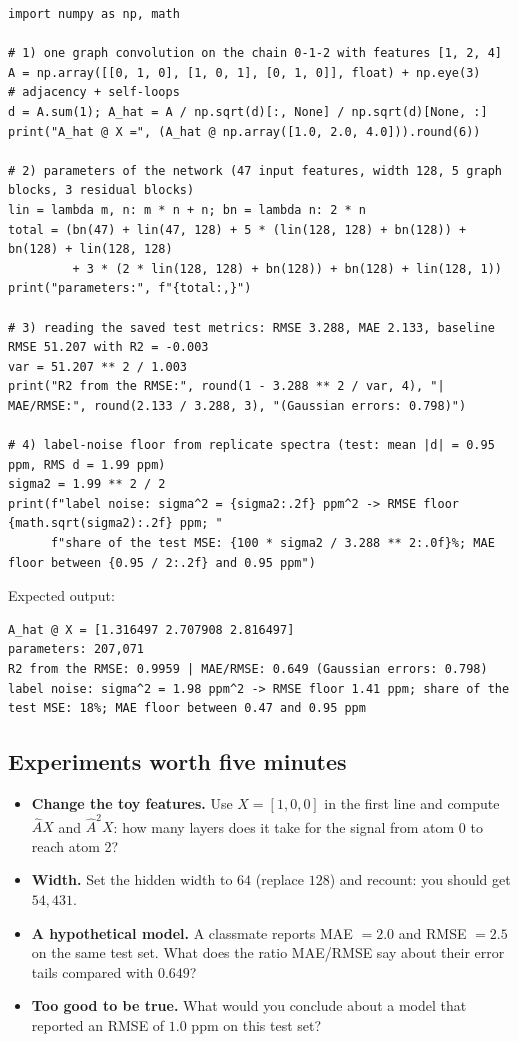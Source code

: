 \documentclass[11pt]{article}
\newcommand{\Ah}{\hat{A}}
\begin{document}
\begin{lstlisting}
import numpy as np, math

# 1) one graph convolution on the chain 0-1-2 with features [1, 2, 4]
A = np.array([[0, 1, 0], [1, 0, 1], [0, 1, 0]], float) + np.eye(3)      # adjacency + self-loops
d = A.sum(1); A_hat = A / np.sqrt(d)[:, None] / np.sqrt(d)[None, :]
print("A_hat @ X =", (A_hat @ np.array([1.0, 2.0, 4.0])).round(6))

# 2) parameters of the network (47 input features, width 128, 5 graph blocks, 3 residual blocks)
lin = lambda m, n: m * n + n; bn = lambda n: 2 * n
total = (bn(47) + lin(47, 128) + 5 * (lin(128, 128) + bn(128)) + bn(128) + lin(128, 128)
         + 3 * (2 * lin(128, 128) + bn(128)) + bn(128) + lin(128, 1))
print("parameters:", f"{total:,}")

# 3) reading the saved test metrics: RMSE 3.288, MAE 2.133, baseline RMSE 51.207 with R2 = -0.003
var = 51.207 ** 2 / 1.003
print("R2 from the RMSE:", round(1 - 3.288 ** 2 / var, 4), "| MAE/RMSE:", round(2.133 / 3.288, 3), "(Gaussian errors: 0.798)")

# 4) label-noise floor from replicate spectra (test: mean |d| = 0.95 ppm, RMS d = 1.99 ppm)
sigma2 = 1.99 ** 2 / 2
print(f"label noise: sigma^2 = {sigma2:.2f} ppm^2 -> RMSE floor {math.sqrt(sigma2):.2f} ppm; "
      f"share of the test MSE: {100 * sigma2 / 3.288 ** 2:.0f}%; MAE floor between {0.95 / 2:.2f} and 0.95 ppm")
\end{lstlisting}

Expected output:
\begin{lstlisting}[language={},basicstyle=\ttfamily\small]
A_hat @ X = [1.316497 2.707908 2.816497]
parameters: 207,071
R2 from the RMSE: 0.9959 | MAE/RMSE: 0.649 (Gaussian errors: 0.798)
label noise: sigma^2 = 1.98 ppm^2 -> RMSE floor 1.41 ppm; share of the test MSE: 18%; MAE floor between 0.47 and 0.95 ppm
\end{lstlisting}

\subsection{Experiments worth five minutes}
\begin{itemize}[nosep]
  \item \textbf{Change the toy features.} Use $X=[1,0,0]$ in the first line and compute $\Ah X$ and $\Ah^2X$: how many layers does it take for the signal from atom 0 to reach atom 2?
  \item \textbf{Width.} Set the hidden width to $64$ (replace $128$) and recount: you should get $54{,}431$.
  \item \textbf{A hypothetical model.} A classmate reports MAE $=2.0$ and RMSE $=2.5$ on the same test set. What does the ratio MAE/RMSE say about their error tails compared with $0.649$?
  \item \textbf{Too good to be true.} What would you conclude about a model that reported an RMSE of $1.0$ ppm on this test set?
\end{itemize}
\end{document}
